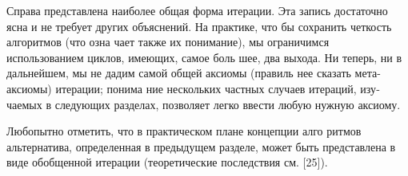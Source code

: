 \noindent Справа представлена наиболее общая форма 
итерации. Эта запись достаточно ясна и не 
требует других объяснений.  На практике, что­
бы сохранить четкость алгоритмов (что озна­
чает также их понимание), мы ограничимся              
использованием  циклов,  имеющих,  самое  боль­
шее,  два  выхода.  Ни  теперь,  ни  в  дальнейшем, 
мы  не  дадим  самой  общей  аксиомы  (правиль­
нее  сказать  мета-аксиомы)  итерации;  понима­
ние нескольких частных случаев итераций, изу­
чаемых в следующих разделах,  позволяет легко 
ввести  любую  нужную  аксиому.

Любопытно отметить,  что  в  практическом  плане  концепции  алго­
ритмов альтернатива, определенная в предыдущем разделе, может быть 
представлена в виде обобщенной итерации  (теоретические  последствия 
см.  [25]).
